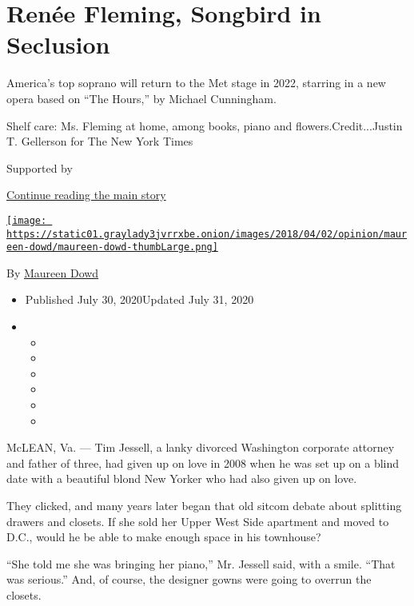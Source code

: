 \hypertarget{renuxe9e-fleming-songbird-in-seclusion}{%
\section{Renée Fleming, Songbird in
Seclusion}\label{renuxe9e-fleming-songbird-in-seclusion}}

America's top soprano will return to the Met stage in 2022, starring in
a new opera based on ``The Hours,'' by Michael Cunningham.

Shelf care: Ms. Fleming at home, among books, piano and
flowers.Credit...Justin T. Gellerson for The New York Times

Supported by

\protect\hyperlink{after-sponsor}{Continue reading the main story}

\href{https://www.nytimes3xbfgragh.onion/by/maureen-dowd}{\texttt{[image: https://static01.graylady3jvrrxbe.onion/images/2018/04/02/opinion/maureen-dowd/maureen-dowd-thumbLarge.png]}}

By \href{https://www.nytimes3xbfgragh.onion/by/maureen-dowd}{Maureen
Dowd}

\begin{itemize}
\item
  Published July 30, 2020Updated July 31, 2020
\item
  \begin{itemize}
  \item
  \item
  \item
  \item
  \item
  \item
  \end{itemize}
\end{itemize}

McLEAN, Va. --- Tim Jessell, a lanky divorced Washington corporate
attorney and father of three, had given up on love in 2008 when he was
set up on a blind date with a beautiful blond New Yorker who had also
given up on love.

They clicked, and many years later began that old sitcom debate about
splitting drawers and closets. If she sold her Upper West Side apartment
and moved to D.C., would he be able to make enough space in his
townhouse?

``She told me she was bringing her piano,'' Mr. Jessell said, with a
smile. ``That was serious.'' And, of course, the designer gowns were
going to overrun the closets.

